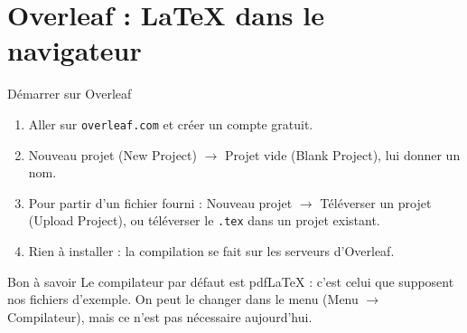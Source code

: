 \section{Overleaf : \texorpdfstring{\LaTeX}{LaTeX} dans le navigateur}

\begin{frame}{Démarrer sur Overleaf}
  \small
  \begin{enumerate}
    \item Aller sur \texttt{overleaf.com} et créer un compte gratuit.
    \item Nouveau projet (New Project) $\to$ Projet vide (Blank Project),
      lui donner un nom.
    \item Pour partir d'un fichier fourni : Nouveau projet $\to$
      Téléverser un projet (Upload Project), ou téléverser le
      \texttt{.tex} dans un projet existant.
    \item Rien à installer : la compilation se fait sur les serveurs
      d'Overleaf.
  \end{enumerate}
  \vspace{4pt}
  \begin{Rem}{Bon à savoir}
    \small Le compilateur par défaut est pdfLaTeX : c'est celui que
    supposent nos fichiers d'exemple. On peut le changer dans le
    menu (Menu $\to$ Compilateur), mais ce n'est pas nécessaire
    aujourd'hui.
  \end{Rem}
\end{frame}

